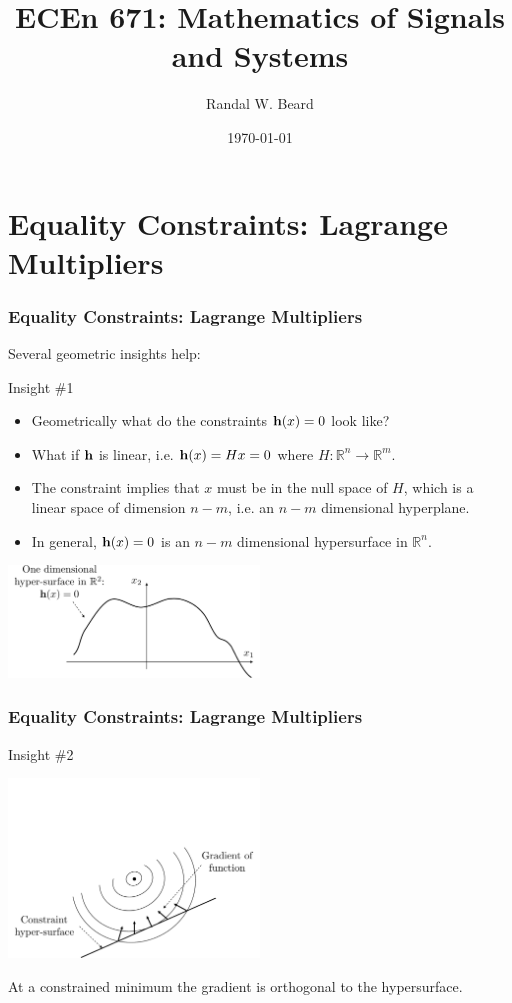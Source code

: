 \documentclass{beamer}
\title{ECEn 671: Mathematics of Signals and Systems}
\author{Randal W. Beard}
\institute{Brigham Young University}
\date{\today}
\begin{document}
\begin{frame}
	\titlepage
\end{frame}



\section{Equality Constraints: Lagrange Multipliers}
\frame{\sectionpage}

\begin{frame}\frametitle{Equality Constraints: Lagrange Multipliers}
	Several geometric insights help:
	
	{\color{blue}Insight  \#1} 
	\begin{itemize}
		\item Geometrically what do the constraints $\mathbf{h}(x) = 0$ look like?
		\item What if $\mathbf{h}$ is linear, i.e. $\mathbf{h}(x) = Hx = 0$ where $H:\mathbb{R}^n\to\mathbb{R}^m$.
		\item The constraint implies that $x$ must be in the null space of $H$, which is a linear space of dimension $n-m$, i.e. an $n-m$ dimensional hyperplane.
		\item In general, $\mathbf{h}(x)=0$ is an $n-m$ dimensional hypersurface in $\mathbb{R}^n$.
	\end{itemize}

	\begin{center}
		\includegraphics[width=0.5\textwidth]
			{figures/chap18_hypersurface}
	\end{center}
	
\end{frame}

\begin{frame}\frametitle{Equality Constraints: Lagrange Multipliers}
	{\color{blue}Insight  \#2}
	\begin{center}
		\includegraphics[width=0.5\textwidth]
			{figures/chap18_gradient_on_constraint}
	\end{center}
	
	At a constrained minimum the gradient is orthogonal to the hypersurface.
\end{frame}
\end{document}
